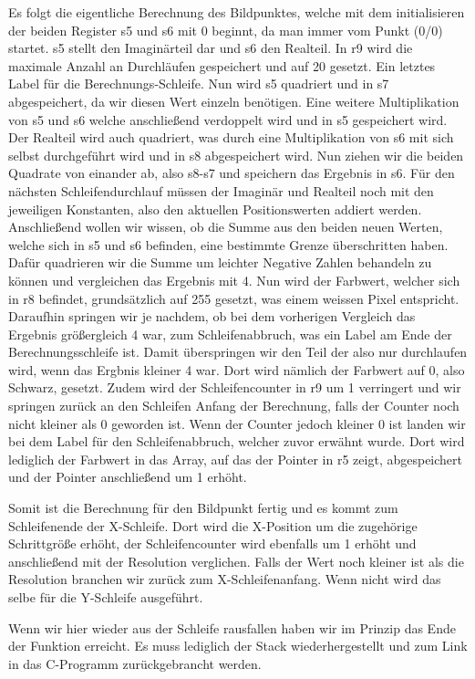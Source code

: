 \documentclass[11pt]{scrartcl}
\begin{document}
Es folgt die eigentliche Berechnung des Bildpunktes, welche mit dem initialisieren der beiden Register s5 und s6 mit 0 beginnt, da man immer vom Punkt (0/0) startet.
s5 stellt den Imaginärteil dar und s6 den Realteil.
In r9 wird die maximale Anzahl an Durchläufen gespeichert und auf 20 gesetzt.
Ein letztes Label für die Berechnungs-Schleife. Nun wird s5 quadriert und in s7 abgespeichert, da wir diesen Wert einzeln benötigen.
Eine weitere Multiplikation von s5 und s6 welche anschließend verdoppelt wird und in s5 gespeichert wird.
Der Realteil wird auch quadriert, was durch eine Multiplikation von s6 mit sich selbst durchgeführt wird und in s8 abgespeichert wird.
Nun ziehen wir die beiden Quadrate von einander ab, also s8-s7 und speichern das Ergebnis in s6.
Für den nächsten Schleifendurchlauf müssen der Imaginär und Realteil noch mit den jeweiligen Konstanten, also den aktuellen Positionswerten addiert werden.
Anschließend wollen wir wissen, ob die Summe aus den beiden neuen Werten, welche sich in s5 und s6 befinden, eine bestimmte Grenze überschritten haben.
Dafür quadrieren wir die Summe um leichter Negative Zahlen behandeln zu können und vergleichen das Ergebnis mit 4.
Nun wird der Farbwert, welcher sich in r8 befindet, grundsätzlich auf 255 gesetzt, was einem weissen Pixel entspricht.
Daraufhin springen wir je nachdem, ob bei dem vorherigen Vergleich das Ergebnis größergleich 4 war, zum Schleifenabbruch, was ein Label am Ende der Berechnungsschleife ist.
Damit überspringen wir den Teil der also nur durchlaufen wird, wenn das Ergbnis kleiner 4 war. Dort wird nämlich der Farbwert auf 0, also Schwarz, gesetzt.
Zudem wird der Schleifencounter in r9 um 1 verringert und wir springen zurück an den Schleifen Anfang der Berechnung, falls der Counter noch nicht kleiner als 0 geworden ist.
Wenn der Counter jedoch kleiner 0 ist landen wir bei dem Label für den Schleifenabbruch, welcher zuvor erwähnt wurde.
Dort wird lediglich der Farbwert in das Array, auf das der Pointer in r5 zeigt, abgespeichert und der Pointer anschließend um 1 erhöht.

Somit ist die Berechnung für den Bildpunkt fertig und es kommt zum Schleifenende der X-Schleife.
Dort wird die X-Position um die zugehörige Schrittgröße erhöht, der Schleifencounter wird ebenfalls um 1 erhöht und anschließend mit der Resolution verglichen.
Falls der Wert noch kleiner ist als die Resolution branchen wir zurück zum X-Schleifenanfang.
Wenn nicht wird das selbe für die Y-Schleife ausgeführt.

Wenn wir hier wieder aus der Schleife rausfallen haben wir im Prinzip das Ende der Funktion erreicht.
Es muss lediglich der Stack wiederhergestellt und zum Link in das C-Programm zurückgebrancht werden.
\end{document}

